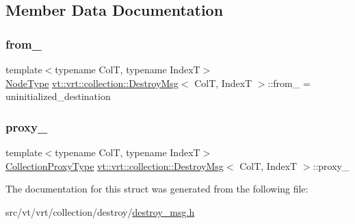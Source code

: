 \subsection{Member Data Documentation}
\mbox{\label{structvt_1_1vrt_1_1collection_1_1_destroy_msg_af7e63ed16c9518f87d244fc8b0cb9ed4}} 
\subsubsection{\texorpdfstring{from\+\_\+}{from\_}}
{\footnotesize\ttfamily template$<$typename ColT, typename IndexT$>$ \\
\hyperlink{namespacevt_a866da9d0efc19c0a1ce79e9e492f47e2}{Node\+Type} \hyperlink{structvt_1_1vrt_1_1collection_1_1_destroy_msg}{vt\+::vrt\+::collection\+::\+Destroy\+Msg}$<$ ColT, IndexT $>$\+::from\+\_\+ = uninitialized\+\_\+destination\hspace{0.3cm}{\ttfamily [private]}}

\mbox{\label{structvt_1_1vrt_1_1collection_1_1_destroy_msg_ae8495f29e1e0627f6250543042a24c74}} 
\subsubsection{\texorpdfstring{proxy\+\_\+}{proxy\_}}
{\footnotesize\ttfamily template$<$typename ColT, typename IndexT$>$ \\
\hyperlink{structvt_1_1vrt_1_1collection_1_1_destroy_msg_a5bf089cacadf94e55e9ae797c4cd0462}{Collection\+Proxy\+Type} \hyperlink{structvt_1_1vrt_1_1collection_1_1_destroy_msg}{vt\+::vrt\+::collection\+::\+Destroy\+Msg}$<$ ColT, IndexT $>$\+::proxy\+\_\+\hspace{0.3cm}{\ttfamily [private]}}



The documentation for this struct was generated from the following file\+:\begin{DoxyCompactItemize}
\item 
src/vt/vrt/collection/destroy/\hyperlink{destroy__msg_8h}{destroy\+\_\+msg.\+h}\end{DoxyCompactItemize}
